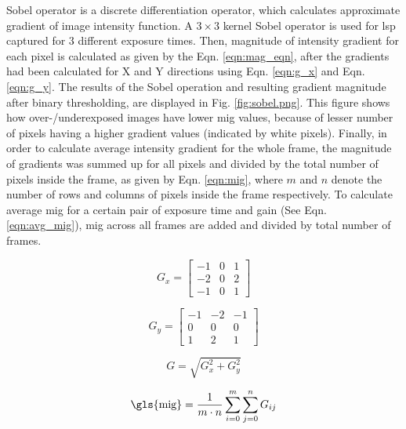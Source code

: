 \vspace{5mm}
\noindent Sobel operator is a discrete differentiation operator, which calculates approximate gradient of image intensity function. A $3\times3$ kernel Sobel operator is used for \gls{lsp} captured for 3 different exposure times. Then, magnitude of intensity gradient for each pixel is calculated as given by the Eqn. \ref{eqn:mag_eqn}, after the gradients had been calculated for X and Y directions using Eqn. \ref{eqn:g_x} and Eqn. \ref{eqn:g_y}. The results of the Sobel operation and resulting gradient magnitude after binary thresholding, are displayed in Fig. \ref{fig:sobel.png}. This figure shows how over-/underexposed images have lower \gls{mig} values, because of lesser number of pixels having a higher gradient values (indicated by white pixels). Finally, in order to calculate average intensity gradient for the whole frame, the magnitude of gradients was summed up for all pixels and divided by the total number of pixels inside the frame, as given by Eqn. \ref{eqn:mig}, where $m$ and $n$ denote the number of rows and columns of pixels inside the frame respectively. To calculate average \gls{mig} for a certain pair of exposure time and gain (See Eqn. \ref{eqn:avg_mig}), \gls{mig} across all frames are added and divided by total number of frames. 

\begin{equation}
    G_x = 
    \begin{bmatrix}
        -1 & 0 & 1 \\
        -2 & 0 & 2 \\
        -1 & 0 & 1 
    \end{bmatrix}
    \label{eqn:g_x}
\end{equation}

\begin{equation}
    G_y = 
    \begin{bmatrix}
        -1 & -2 & -1 \\
        0 & 0 & 0 \\
        1 & 2 & 1 
    \end{bmatrix}
    \label{eqn:g_y}
\end{equation}

\begin{equation}
    G = \sqrt{G_x^2 + G_y^2}
    \label{eqn:mag_eqn}
\end{equation}

\begin{equation}
    \text{\gls{mig}} = \frac{1}{m \cdot n} \sum_{i=0}^{m} \sum_{j=0}^{n} G_{ij}
    \label{eqn:mig}
\end{equation}

